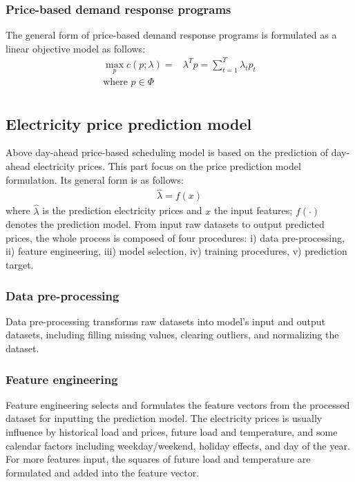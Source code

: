 \documentclass[journal]{IEEEtran}
\begin{document}
\subsubsection{Price-based demand response programs}
The general form of price-based demand response programs is formulated as a linear objective model as follows:
\begin{equation}
  \label{PriceDR}
  \begin{aligned}
    \max_{p} c(p; \lambda) = &\lambda^T p = \sum_{t=1}^T \lambda_t p_t \\
    \text{where }  p \in \Phi \\
  \end{aligned}
\end{equation}

\subsection{Electricity price prediction model}
Above day-ahead price-based scheduling model is based on the prediction of day-ahead electricity prices. This part focus on the price prediction model formulation. Its general form is as follows:
\begin{equation}
  \label{Prediction}
  \begin{aligned}
    \hat{\lambda} = f(x)
  \end{aligned}
\end{equation}
where $\hat{\lambda}$ is the prediction electricity prices and $x$ the input features; $f(\cdot)$ denotes the prediction model. From input raw datasets to output predicted prices, the whole process is composed of four procedures: i) data pre-processing, ii) feature engineering, iii) model selection, iv) training procedures, v) prediction target.

\subsubsection{Data pre-processing}
Data pre-processing transforms raw datasets into model's input and output datasets, including filling missing values,  clearing outliers, and normalizing the dataset. 

\subsubsection{Feature engineering}
Feature engineering selects and formulates the feature vectors from the processed dataset for inputting the prediction model. The electricity prices is usually influence by historical load and prices, future load and temperature, and some calendar factors including weekday/weekend, holiday effects, and day of the year. For more features input, the squares of future load and temperature are formulated and added into the feature vector.
\end{document}
